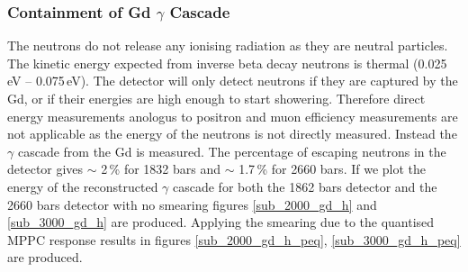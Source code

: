 \documentclass[12pt,a4paper]{article}
\begin{document}
\subsubsection{Containment of Gd $\gamma$ Cascade}
The neutrons do not release any ionising radiation as they are neutral particles. The kinetic energy expected from inverse beta decay neutrons is thermal (0.025\,eV -- 0.075\,eV). The detector will only detect neutrons if they are captured by the Gd, or if their energies are high enough to start showering. Therefore direct energy measurements anologus to positron and muon efficiency measurements are not applicable as the energy of the neutrons is not directly measured. Instead the $\gamma$ cascade from the Gd is measured. The percentage of escaping neutrons in the detector gives $\sim$ 2\,\% for 1832 bars and $\sim$ 1.7\,\% for 2660 bars. If we plot the energy of the reconstructed $\gamma$ cascade for both the 1862 bars detector and the 2660 bars detector with no smearing figures \ref{sub_2000_gd_h} and \ref{sub_3000_gd_h} are produced. Applying the smearing due to the quantised MPPC response results in figures \ref{sub_2000_gd_h_peq}, \ref{sub_3000_gd_h_peq} are produced. 
\end{document}
